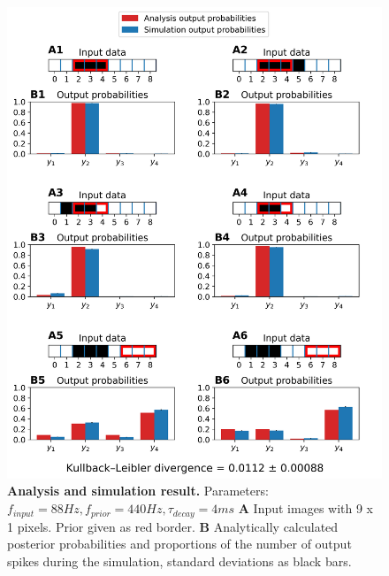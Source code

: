 \begin{figure}
  \includegraphics[width=\linewidth]{figures/1D/1D_88_440_4.png}
       \caption{\textbf{Analysis and simulation result. } Parameters: $f_{input} = 88 Hz, f_{prior} = 440 Hz, \tau_{decay} = 4 ms$ \textbf{A} Input images with 9 x 1 pixels. Prior given as red border. \textbf{B} Analytically calculated posterior probabilities and proportions of the number of output spikes during the simulation, standard deviations as black bars.}
  \label{fig:1D_88_440_4}
\end{figure}

